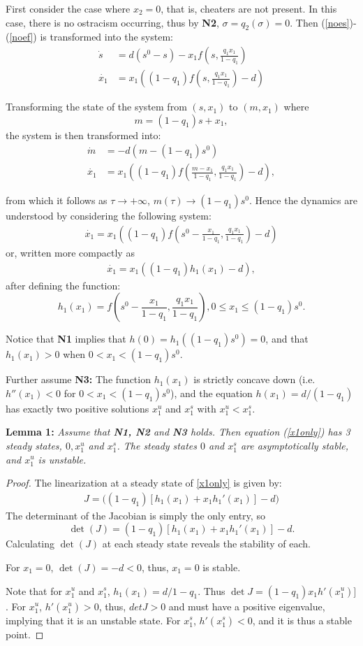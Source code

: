 \documentclass[12pt]{article}
\begin{document}
\noindent First consider the case where $x_2=0$, that is, cheaters are not present. In this case, there is no ostracism occurring, thus by \textbf{N2}, $\sigma = q_2(\sigma ) =0$. Then (\ref{noes})-(\ref{noef}) is transformed into the system: 
\begin{align}
\dot{s}&=d(s^0-s)-x_1 f(s,\frac{q_1 x_1}{1-q_1})\\
\dot{x_1} &= x_1((1-q_1)f(s,\frac{q_1 x_1}{1-q_1})-d)
\end{align}

\noindent Transforming the state of the system from $(s,x_1)$ to $(m,x_1)$ where $$m=(1-q_1)s+x_1,$$ the system is then transformed into: 
\begin{align}
\dot{m}&=-d(m-(1-q_1)s^0)\\
\dot{x_1} &= x_1((1-q_1)f(\frac{m-x_1}{1-q_1},\frac{q_1 x_1}{1-q_1})-d),
\end{align}

\noindent from which it follows as $\tau \rightarrow +\infty$, $m(\tau ) \rightarrow (1-q_1)s^0$. Hence the dynamics are understood by considering the following system: 
\begin{align*}
\dot{x_1}=x_1((1-q_1)f(s^0- \frac{x_1}{1-q_1},\frac{q_1 x_1}{1-q_1})-d)
\end{align*}
or, written more compactly as 
\begin{align}
\dot{x_1}=x_1((1-q_1)h_1(x_1)-d), \label{x1only}
\end{align}
after defining the function: $$h_1(x_1)=f(s^0- \frac{x_1}{1-q_1},\frac{q_1 x_1}{1-q_1}), 0\leq x_1 \leq (1-q_1)s^0.$$

\noindent Notice that \textbf{N1} implies that $h(0)=h_1((1-q_1)s^0)=0$, and that $h_1(x_1)>0$ when $0<x_1<(1-q_1)s^0$.

\noindent Further assume \textbf{N3: } The function $h_1(x_1)$ is strictly concave down (i.e. $h''(x_1)<0$ for $0<x_1<(1-q_1)s^0$), and the equation $h(x_1)= d/ (1-q_1)$ has exactly two positive solutions $x_1^u$ and $x_1^s$ with $x_1^u<x_1^s$.

\textbf{Lemma 1: } \textit{Assume that \textbf{N1, N2} and \textbf{N3} holds. Then equation (\ref{x1only}) has 3 steady states, $0, x_1^u$ and $x_1^s$. The steady states $0$ and $x_1^s$ are asymptotically stable, and $x_1^u$ is unstable.}

\begin{proof}
The linearization at a steady state of \ref{x1only} is given by: 
\begin{align*}
J=\bigg((1-q_1)[h_1(x_1)+x_1h_1'(x_1)]-d \bigg)
\end{align*}
The determinant of the Jacobian is simply the only entry, so $$\det{(J)}=(1-q_1)[h_1(x_1)+x_1h_1'(x_1)]-d.$$ 
Calculating $\det{(J)}$ at each steady state reveals the stability of each. 

\noindent For $x_1=0$, $\det{(J)}=-d<0$, thus, $x_1=0$ is stable. 

\noindent Note that for $x_1^u$ and $x_1^s$, $h_1(x_1)=d/1-q_1$. Thus $\det{J}=(1-q_1)x_1h'(x_1^u)]$. For $x_1^u$, $h'(x_1^u)>0$, thus, $det{J}>0$ and must have a positive eigenvalue, implying that it is an unstable state. For $x_1^s$, $h'(x_1^s)<0$, and it is thus a stable point.  
\end{proof}
\end{document}
